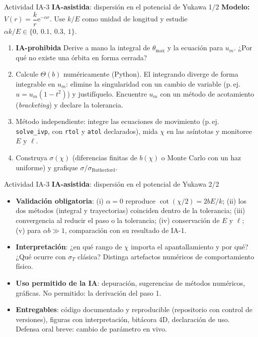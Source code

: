 \documentclass[aspectratio=169]{beamer}
\newcommand{\tmax}{\theta_{\max}}
\newcommand{\um}{u_{m}}
\newcommand{\IAprohibida}{\colorbox{red!20}{\scriptsize\textbf{IA-prohibida}}}
\newcommand{\IAasistida}{\colorbox{yellow!30}{\scriptsize\textbf{IA-asistida}}}
\begin{document}
\begin{frame}{Actividad IA-3 \IAasistida: dispersión en el potencial de Yukawa 1/2}
\small
\textbf{Modelo:} $V(r)=\dfrac{k}{r}\mathrm{e}^{-\alpha r}$. Use $k/E$ como unidad de longitud
y estudie $\alpha k/E\in\{0,\ 0.1,\ 0.3,\ 1\}$.
\begin{enumerate}
  \item<1-> \IAprohibida{} Derive a mano la integral de $\tmax$ y la ecuación para
        $\um$. ¿Por qué no existe una órbita en forma cerrada?
  \item<2-> Calcule $\Theta(b)$ numéricamente (Python). El integrando diverge de forma
        integrable en $\um$: elimine la singularidad con un cambio de variable
        (p.\,ej. $u=\um(1-t^{2})$) y justifíquelo. Encuentre $\um$ con un método de
        acotamiento (\emph{bracketing}) y declare la tolerancia.
  \item<3-> Método independiente: integre las ecuaciones de movimiento
        (p.\,ej. \texttt{solve\_ivp}, con \texttt{rtol} y \texttt{atol} declarados),
        mida $\chi$ en las asíntotas y monitoree $E$ y $\ell$.
  \item<4-> Construya $\sigma(\chi)$ (diferencias finitas de $b(\chi)$ o Monte Carlo con
        un haz uniforme) y grafique $\sigma/\sigma_{\text{Rutherford}}$.
\end{enumerate}
\end{frame}

\begin{frame}{Actividad IA-3 \IAasistida: dispersión en el potencial de Yukawa 2/2}
\begin{itemize}
  \item<1-> \textbf{Validación obligatoria}:
        (i) $\alpha=0$ reproduce $\cot(\chi/2)=2bE/k$;
        (ii) los dos métodos (integral y trayectorias) coinciden dentro de la tolerancia;
        (iii) convergencia al reducir el paso o la tolerancia;
        (iv) conservación de $E$ y $\ell$;
        (v) para $\alpha b\gg1$, comparación con su resultado de IA-1.
  \item<2-> \textbf{Interpretación}: ¿en qué rango de $\chi$ importa el apantallamiento y
        por qué? ¿Qué ocurre con $\sigma_T$ clásica? Distinga artefactos numéricos de
        comportamiento físico.
  \item<3-> \textbf{Uso permitido de la IA}: depuración, sugerencias de métodos numéricos,
        gráficas. No permitido: la derivación del paso 1.
  \item<4-> \textbf{Entregables}: código documentado y reproducible (repositorio con
        control de versiones), figuras con interpretación, bitácora 4D, declaración de uso.
        Defensa oral breve: cambio de parámetro en vivo.
\end{itemize}
\end{frame}
\end{document}
